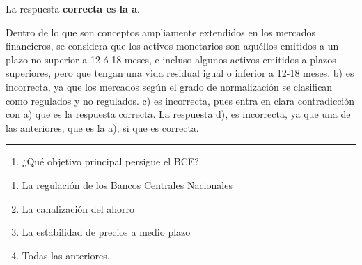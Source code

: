 \documentclass[
  letterpaper,
  DIV=11,
  numbers=noendperiod]{scrreprt}
\providecommand{\tightlist}{%
  \setlength{\itemsep}{0pt}\setlength{\parskip}{0pt}}\usepackage{longtable,booktabs,array}
\begin{document}
\begin{tcolorbox}[enhanced jigsaw, left=2mm, opacityback=0, colback=white, breakable, arc=.35mm, bottomrule=.15mm, rightrule=.15mm, toprule=.15mm, leftrule=.75mm, colframe=quarto-callout-tip-color-frame]
\begin{minipage}[t]{5.5mm}
\textcolor{quarto-callout-tip-color}{\faLightbulb}
\end{minipage}%
\begin{minipage}[t]{\textwidth - 5.5mm}

La respuesta \textbf{correcta es la a}.

Dentro de lo que son conceptos ampliamente extendidos en los mercados
financieros, se considera que los activos monetarios son aquéllos
emitidos a un plazo no superior a 12 ó 18 meses, e incluso algunos
activos emitidos a plazos superiores, pero que tengan una vida residual
igual o inferior a 12-18 meses. b) es incorrecta, ya que los mercados
según el grado de normalización se clasifican como regulados y no
regulados. c) es incorrecta, pues entra en clara contradicción con a)
que es la respuesta correcta. La respuesta d), es incorrecta, ya que una
de las anteriores, que es la a), si que es correcta.

\end{minipage}%
\end{tcolorbox}

\begin{center}\rule{0.5\linewidth}{0.5pt}\end{center}

\begin{enumerate}
\def\labelenumi{\arabic{enumi}.}
\setcounter{enumi}{19}
\tightlist
\item
  ¿Qué objetivo principal persigue el BCE?
\end{enumerate}

\begin{enumerate}
\def\labelenumi{\alph{enumi})}
\item
  La regulación de los Bancos Centrales Nacionales
\item
  La canalización del ahorro
\item
  La estabilidad de precios a medio plazo
\item
  Todas las anteriores.
\end{enumerate}
\end{document}
